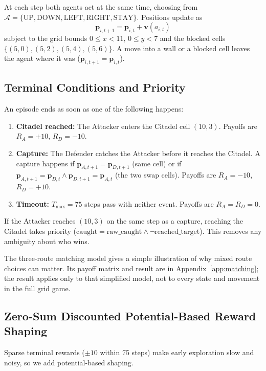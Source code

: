 \documentclass[conference]{IEEEtran}
\begin{document}
At each step both agents act at the same time, choosing from $\mathcal{A} = \{\text{UP}, \text{DOWN}, \text{LEFT}, \text{RIGHT}, \text{STAY}\}$. Positions update as
\begin{equation}
\bm{p}_{i, t+1} = \bm{p}_{i, t} + \bm{v}(a_{i, t})
\end{equation}
subject to the grid bounds $0 \le x < 11$, $0 \le y < 7$ and the blocked cells $\{(5, 0), (5, 2), (5, 4), (5, 6)\}$. A move into a wall or a blocked cell leaves the agent where it was ($\bm{p}_{i, t+1} = \bm{p}_{i, t}$).

\subsection{Terminal Conditions and Priority}
An episode ends as soon as one of the following happens:
\begin{enumerate}
    \item \textbf{Citadel reached:} The Attacker enters the Citadel cell $(10, 3)$. Payoffs are $R_A = +10$, $R_D = -10$.
    \item \textbf{Capture:} The Defender catches the Attacker before it reaches the Citadel. A capture happens if $\bm{p}_{A, t+1} = \bm{p}_{D, t+1}$ (same cell) or if $\bm{p}_{A, t+1} = \bm{p}_{D, t} \land \bm{p}_{D, t+1} = \bm{p}_{A, t}$ (the two swap cells). Payoffs are $R_A = -10$, $R_D = +10$.
    \item \textbf{Timeout:} $T_{\max} = 75$ steps pass with neither event. Payoffs are $R_A = R_D = 0$.
\end{enumerate}
If the Attacker reaches $(10, 3)$ on the same step as a capture, reaching the Citadel takes priority ($\text{caught} = \text{raw\_caught} \land \neg \text{reached\_target}$). This removes any ambiguity about who wins.

The three-route matching model gives a simple illustration of why mixed route choices can matter. Its payoff matrix and result are in Appendix~\ref{app:matching}; the result applies only to that simplified model, not to every state and movement in the full grid game.

\subsection{Zero-Sum Discounted Potential-Based Reward Shaping}
Sparse terminal rewards ($\pm 10$ within 75 steps) make early exploration slow and noisy, so we add potential-based shaping.
\end{document}
